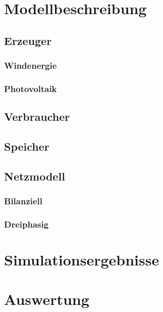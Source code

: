 \chapter{Modellbeschreibung}
\section{Erzeuger}
\subsection{Windenergie}
\subsection{Photovoltaik}
\section{Verbraucher}
\section{Speicher}
\section{Netzmodell}
\subsection{Bilanziell}
\subsection{Dreiphasig}


\chapter{Simulationsergebnisse}

\chapter{Auswertung}